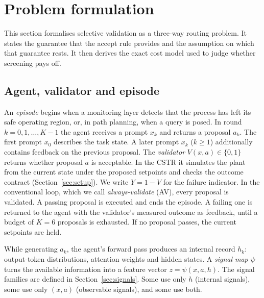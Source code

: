 \section{Problem formulation}\label{sec:problem}

This section formalises selective validation as a three-way routing problem. It states the guarantee that the
accept rule provides and the assumption on which that guarantee rests. It then derives the exact cost model
used to judge whether screening pays off.

\subsection{Agent, validator and episode}
An \emph{episode} begins when a monitoring layer detects that the process has left its safe operating region,
or, in path planning, when a query is posed. In round $k=0,1,\dots,K-1$ the agent receives a prompt $x_k$ and
returns a proposal $a_k$. The first prompt $x_0$ describes the task state. A later prompt $x_k$ ($k\ge 1$)
additionally contains feedback on the previous proposal. The \emph{validator} $V(x,a)\in\{0,1\}$ returns
whether proposal $a$ is acceptable. In the CSTR it simulates the plant from the current state under the proposed
setpoints and checks the outcome contract (Section~\ref{sec:setup}). We write $Y=1-V$ for the failure
indicator. In the conventional loop, which we call \emph{always-validate} (AV), every proposal is validated. A
passing proposal is executed and ends the episode. A failing one is returned to the agent with the validator's
measured outcome as feedback, until a budget of $K=6$ proposals is exhausted. If no proposal passes, the current
setpoints are held.

While generating $a_k$, the agent's forward pass produces an internal record $h_k$: output-token
distributions, attention weights and hidden states. A \emph{signal map} $\psi$ turns the available information
into a feature vector $z=\psi(x,a,h)$. The signal families are defined in Section~\ref{sec:signals}. Some use
only $h$ (internal signals), some use only $(x,a)$ (observable signals), and some use both.

